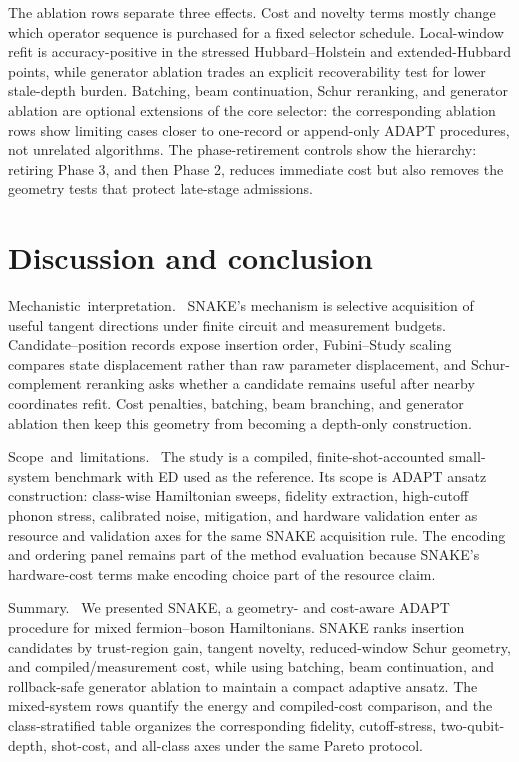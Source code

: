 \documentclass[
  reprint,
  amsmath,
  amssymb,
  aps,
  pra,
  nofootinbib,
  superscriptaddress,
  floatfix
]{revtex4-2}
\newcommand{\tentative}[1]{\textcolor{red!70!black}{#1}}
\newcommand{\structlabel}[1]{\noindent\mbox{\tentative{#1.}}~}
\begin{document}
The ablation rows separate three effects. Cost and novelty terms mostly change which operator sequence is purchased for a fixed selector schedule. Local-window refit is accuracy-positive in the stressed Hubbard--Holstein and extended-Hubbard points, while generator ablation trades an explicit recoverability test for lower stale-depth burden. Batching, beam continuation, Schur reranking, and generator ablation are optional extensions of the core selector: the corresponding ablation rows show limiting cases closer to one-record or append-only ADAPT procedures, not unrelated algorithms. The phase-retirement controls show the hierarchy: retiring Phase 3, and then Phase 2, reduces immediate cost but also removes the geometry tests that protect late-stage admissions.


\section{Discussion and conclusion}
\label{sec:discussion}
\label{sec:conclusion}

\structlabel{Mechanistic interpretation}
SNAKE's mechanism is selective acquisition of useful tangent directions under finite circuit and measurement budgets. Candidate--position records expose insertion order, Fubini--Study scaling compares state displacement rather than raw parameter displacement, and Schur-complement reranking asks whether a candidate remains useful after nearby coordinates refit. Cost penalties, batching, beam branching, and generator ablation then keep this geometry from becoming a depth-only construction.

\structlabel{Scope and limitations}
The study is a compiled, finite-shot-accounted small-system benchmark with ED used as the reference. Its scope is ADAPT ansatz construction: class-wise Hamiltonian sweeps, fidelity extraction, high-cutoff phonon stress, calibrated noise, mitigation, and hardware validation enter as resource and validation axes for the same SNAKE acquisition rule. The encoding and ordering panel remains part of the method evaluation because SNAKE's hardware-cost terms make encoding choice part of the resource claim.

\structlabel{Summary}
We presented SNAKE, a geometry- and cost-aware ADAPT procedure for mixed fermion--boson Hamiltonians. SNAKE ranks insertion candidates by trust-region gain, tangent novelty, reduced-window Schur geometry, and compiled/measurement cost, while using batching, beam continuation, and rollback-safe generator ablation to maintain a compact adaptive ansatz. The mixed-system rows quantify the energy and compiled-cost comparison, and the class-stratified table organizes the corresponding fidelity, cutoff-stress, two-qubit-depth, shot-cost, and all-class axes under the same Pareto protocol.
\end{document}
